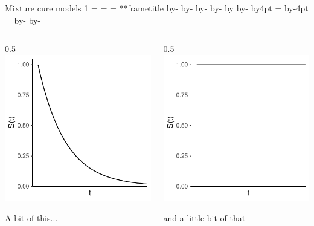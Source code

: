 \documentclass[aspectratio=169,12pt]{beamer} %
\makeatletter
\newif\ifsidebartheme
\newcommand*{\calculatespace}{%
    \contentheight=\paperheight%
    \ifx\beamer@frametitle\@empty%
        \setbox\@tempboxa=\box\voidb@x%
      \else%
        \setbox\@tempboxa=\vbox{%
          \vbox{}%
          {\parskip0pt\usebeamertemplate***{frametitle}}%
        }%
        \ifsidebartheme%
          \advance\contentheight by-1em%
        \fi%
      \fi%
    \advance\contentheight by-\ht\@tempboxa%
    \advance\contentheight by-\dp\@tempboxa%
    \advance\contentheight by-\beamer@frametopskip%
    \ifbeamer@plainframe%
    \contentbottom=0pt%
    \else%
    \advance\contentheight by-\headheight%
    \advance\contentheight by\headdp%
    \advance\contentheight by-\footheight%
    \advance\contentheight by4pt%
    \contentbottom=\footheight%
    \advance\contentbottom by-4pt%
    \fi%
    \contentwidth=\paperwidth%
    \ifbeamer@plainframe%
    \contentleft=0pt%
    \else%
    \advance\contentwidth by-\beamer@rightsidebar%
    \advance\contentwidth by-\beamer@leftsidebar\relax%
    \contentleft=\beamer@leftsidebar%
    \fi%
}
\makeatother
\begin{document}
\begin{frame}{Mixture cure models 1}
\calculatespace%
\begin{columns}
\begin{column}{0.5\contentwidth}
  \centering
  \includegraphics[height=0.7\textheight]{ref/surv1.pdf}

  A bit of this...
\end{column}
\begin{column}{0.5\contentwidth}
  \centering
  \includegraphics[height=0.7\textheight]{ref/surv2.pdf}

  and a little bit of that
\end{column}
\end{columns}
\end{frame}
\end{document}
